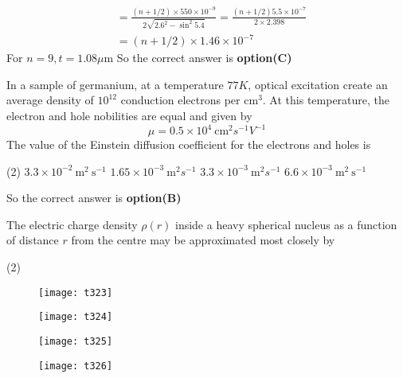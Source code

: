 \begin{questions}
\begin{answer}
$$\begin{aligned}
	&=\frac{(n+1 / 2) \times 550 \times 10^{-9}}{2 \sqrt{2.6^{2}-\sin ^{2} 5.4}}=\frac{(n+1 / 2) 5.5 \times 10^{-7}}{2 \times 2.398} \\
	&=(n+1 / 2) \times 1.46 \times 10^{-7}
	\end{aligned}
	$$
	For $n=9, t=1.08 \mu \mathrm{m}$
	So the correct answer is \textbf{option(C)}
\end{answer}
\begin{minipage}{\textwidth}
	\question In a sample of germanium, at a temperature $77 K$, optical excitation create an average density of $10^{12}$ conduction electrons per $\mathrm{cm}^{3}$. At this temperature, the electron and hole nobilities are equal and given by
	$$
	\mu=0.5 \times 10^{4} \mathrm{~cm}^{2} s^{-1} V^{-1}
	$$
	The value of the Einstein diffusion coefficient for the electrons and holes is
\end{minipage}
\begin{tasks}(2)
	\task[\textbf{A.}] $3.3 \times 10^{-2} \mathrm{~m}^{2} \mathrm{~s}^{-1}$
	\task[\textbf{B.}] $1.65 \times 10^{-3} \mathrm{~m}^{2} s^{-1}$
	\task[\textbf{C.}] $3.3 \times 10^{-3} \mathrm{~m}^{2} s^{-1}$
	\task[\textbf{D.}] $6.6 \times 10^{-3} \mathrm{~m}^{2} \mathrm{~s}^{-1}$
\end{tasks}
\begin{answer}
	So the correct answer is \textbf{option(B)}
\end{answer}
\begin{minipage}{\textwidth}
	\question The electric charge density $\rho(r)$ inside a heavy spherical nucleus as a function of distance $r$ from the centre may be approximated most closely by 
\end{minipage}
\begin{tasks}(2)
	\task[\textbf{A.}] \begin{figure}[H]
		\centering
		\texttt{[image: t323]}
	\end{figure}
	\task[\textbf{B.}] \begin{figure}[H]
		\centering
		\texttt{[image: t324]}
	\end{figure}
	\task[\textbf{C.}] \begin{figure}[H]
		\centering
		\texttt{[image: t325]}
	\end{figure}
	\task[\textbf{D.}] \begin{figure}[H]
		\centering
		\texttt{[image: t326]}
	\end{figure}

\end{tasks}
\end{questions}
